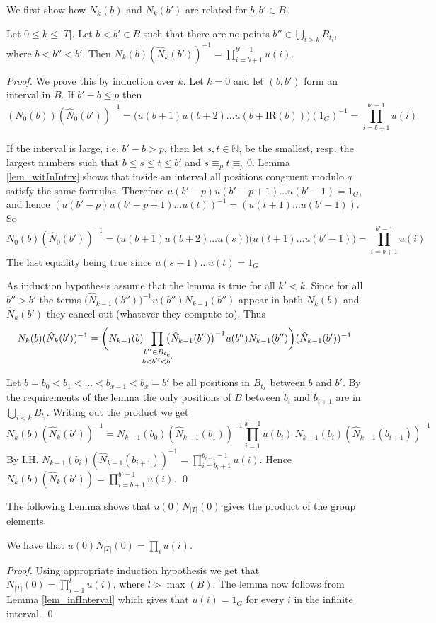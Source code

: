\documentclass[envcountsame]{llncs}
\newcommand{\Nat}{\mathbb{N}}
\newcommand{\IR}{\mathrm{IR}}
\begin{document}
\noindent We first show how $N_k(b)$ and $N_k(b')$ are related for $b,b' \in B$.
\begin{lemma} Let $0 \leq k \leq |T|$.
Let $b<b'\in B$ such that there are no points $b'' \in \bigcup_{i>k} B_{t_i}$, where $b < b'' < b'$. Then
$N_k(b)(\hat N_k(b'))^{-1}=\prod_{i=b+1}^{b'-1} u(i)$.
\end{lemma}
\begin{proof}
We prove this by induction over $k$.
Let $k=0$ and let $(b,b')$ form an interval in $B$. If $b'-b \leq p$ then 
$$(N_0(b))(\hat N_0(b'))^{-1}=\big(u(b+1) u(b+2) \dots u(b+\IR(b))\big)(1_G)^{-1}=\prod_{i=b+1}^{b'-1} u(i)$$

If the interval is large, i.e. $b'-b>p$, then let $s,t \in \Nat$, be the smallest, resp. the largest numbers such that $b\leq s\leq
t\leq b'$ and $s\equiv_p t\equiv_p 0$.
Lemma \ref{lem_witInIntrv} shows that inside an interval all positions congruent modulo $q$ satisfy the same formulas. Therefore $u(b'-p) u(b'-p+1) \dots u(b'-1)=1_G$, and hence $(u(b'-p) u(b'-p+1) \dots u(t))^{-1}=(u(t+1)\dots u(b'-1))$. So 
$$N_0(b)(\hat N_0(b'))^{-1}=\big(u(b+1) u(b+2) \dots u(s)\big) \big(u(t+1)\dots u(b'-1)\big)=\prod_{i=b+1}^{b'-1} u(i)$$
The last equality being true since $u(s+1)\dots u(t)=1_G$

As induction hypothesis assume that the lemma is true for all $k'<k$.
Since for all $b''>b'$ the terms $\big(\hat N_{k-1}(b'')\big)^{-1} u(b'') N_{k-1}(b'')$ appear in both $N_k(b)$ and $\hat N_k(b')$ 
they cancel out (whatever they compute to). Thus 
$$N_k(b)(\hat N_k(b'))^{-1}=\bigg(N_{k-1}(b)\hspace*{-1mm}\prod_{\substack{b''\in B_{t_k}\\b<b''<b'}}\hspace*{-3mm}\big(\hat N_{k-1}(b'')\big)^{-1} u(b'') N_{k-1}(b'')\bigg)(\hat N_{k-1}(b'))^{-1}$$

Let $b=b_0<b_1<\dots<b_{x-1}<b_x=b'$ be all positions in $B_{t_k}$ between $b$ and $b'$. By the requirements of the lemma the only positions of $B$
between $b_i$ and $b_{i+1}$ are in $\bigcup_{i<k} B_{t_i}$. Writing out the product we get 
$$N_k(b)(\hat N_k(b'))^{-1} = N_{k-1}(b_0)\left (\hat N_{k-1}(b_1) \right)^{-1} \prod_{i=1}^{x-1} u(b_i) ~N_{k-1}(b_i)\left (\hat N_{k-1}(b_{i+1}) \right)^{-1}$$
By I.H.  $N_{k-1}(b_i) \left(\hat N_{k-1}(b_{i+1})\right)^{-1}=\prod_{i=b_i+1}^{b_{i+1}-1} u(i)$. Hence
$N_k(b)(\hat N_k(b'))=\prod_{i=b+1}^{b'-1} u(i).$
\qed \end{proof}

The following Lemma shows that $u(0)N_{|T|}(0)$ gives the product of the group elements.
\begin{lemma}\label{lem_whattocomp}
We have that $u(0) N_{|T|}(0)=\prod_i u(i)$.
\end{lemma}
\begin{proof}
Using appropriate induction hypothesis we get that $N_{|T|}(0)=\prod_{i=1}^{l} u(i)$, where $l>\max(B)$. The lemma now follows from Lemma \ref{lem_infInterval} which gives that $u(i)=1_G$ for every $i$ in the infinite interval.
\qed \end{proof}
\end{document}
